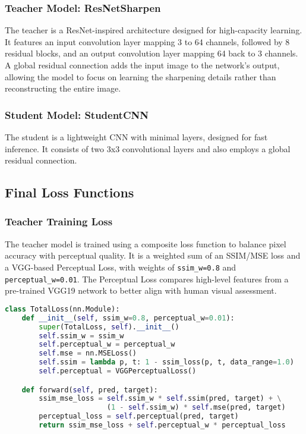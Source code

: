 \documentclass[12pt,a4paper]{article}
\begin{document}
\subsubsection{Teacher Model: ResNetSharpen}
The teacher is a ResNet-inspired architecture designed for high-capacity learning. It features an input convolution layer mapping 3 to 64 channels, followed by 8 residual blocks, and an output convolution layer mapping 64 back to 3 channels. A global residual connection adds the input image to the network's output, allowing the model to focus on learning the sharpening details rather than reconstructing the entire image.

\subsubsection{Student Model: StudentCNN}
The student is a lightweight CNN with minimal layers, designed for fast inference. It consists of two 3x3 convolutional layers and also employs a global residual connection.

\subsection{Final Loss Functions}
\subsubsection{Teacher Training Loss}
The teacher model is trained using a composite loss function to balance pixel accuracy with perceptual quality. It is a weighted sum of an SSIM/MSE loss and a VGG-based Perceptual Loss, with weights of \texttt{ssim\_w=0.8} and \texttt{perceptual\_w=0.01}. The Perceptual Loss compares high-level features from a pre-trained VGG19 network to better align with human visual assessment.
\begin{lstlisting}[language=Python, caption={Composite Loss for Teacher Training}]
class TotalLoss(nn.Module):
    def __init__(self, ssim_w=0.8, perceptual_w=0.01):
        super(TotalLoss, self).__init__()
        self.ssim_w = ssim_w
        self.perceptual_w = perceptual_w
        self.mse = nn.MSELoss()
        self.ssim = lambda p, t: 1 - ssim_loss(p, t, data_range=1.0)
        self.perceptual = VGGPerceptualLoss()

    def forward(self, pred, target):
        ssim_mse_loss = self.ssim_w * self.ssim(pred, target) + \
                        (1 - self.ssim_w) * self.mse(pred, target)
        perceptual_loss = self.perceptual(pred, target)
        return ssim_mse_loss + self.perceptual_w * perceptual_loss
\end{lstlisting}
\end{document}
